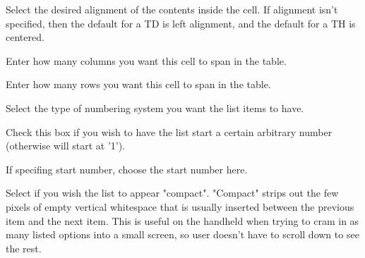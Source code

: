 


 Select the desired alignment of the contents
inside the cell. If alignment isn't specified, then the default for a TD is
left alignment, and the default for a TH is centered.

 Enter how many columns you want this cell to
span in the table.

 Enter how many rows you want this cell to
span in the table.


 Select the type of numbering system
you want the list items to have. \notimplemented

 Check this box if you wish to
have the list start a certain arbitrary number (otherwise will start at '1').
\notimplemented

 If specifing start number, choose the 
start number here. \notimplemented

 Select if you wish the list to appear 
"compact". "Compact" strips out the few pixels of empty vertical whitespace 
that is usually inserted between the previous item and the next item. This is 
useful on the handheld when trying to cram in as many listed options into a 
small screen, so user doesn't have to scroll down to see the rest. 
\notimplemented

